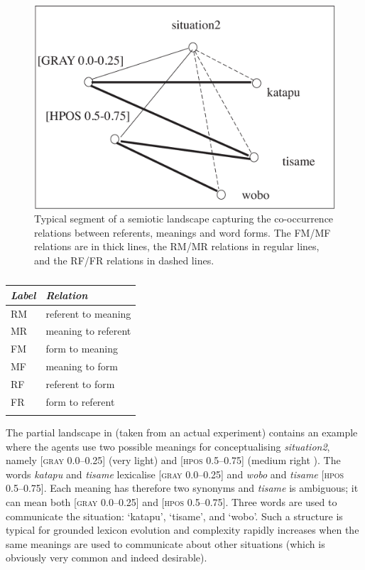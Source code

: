 \begin{figure}[t]
  \centerline{\includegraphics[width=.65\textwidth]{chap7/figs/landscape.pdf}}
\caption{\label{RMF1}Typical segment of a semiotic
landscape capturing the co-occurrence relations between
referents, meanings and word forms. The FM/MF relations are
in thick lines, the RM/MR relations in regular lines, and 
the RF/FR relations in dashed lines.}
\end{figure}
 
\begin{table}[b]
\begin{tabular}{ l  l  }
\lsptoprule
{\itshape Label}& {\itshape Relation } \\ \midrule
RM & referent to meaning \\ 
MR & meaning to referent \\ 
FM & form to meaning\\ 
MF & meaning to form\\ 
RF & referent to form \\ 
FR & form to referent  \\ 
\lspbottomrule
\end{tabular}
\caption{\label{tab:7labelrelation}}
\end{table}

The partial landscape in  (taken from
an actual experiment) contains an example where the agents use
two possible meanings for conceptualising {\itshape situation2}, namely
[\textsc{gray} 0.0–0.25] (very light) and [\textsc{hpos} 0.5–0.75]
(medium right ). The words \textit{katapu} and \textit{tisame} lexicalise
[\textsc{gray} 0.0–0.25] and \textit{wobo} and \textit{tisame} [\textsc{hpos} 0.5–0.75]. 
Each meaning has therefore two synonyms and \textit{tisame} is 
ambiguous; it can mean both [\textsc{gray} 0.0–0.25]
and [\textsc{hpos} 0.5–0.75].
\enlargethispage{1em}
Three words
are used to communicate the situation: `katapu', `tisame', 
and `wobo'. Such a structure is typical for grounded
lexicon evolution and complexity rapidly increases when the
same meanings are used to communicate about other
situations (which is obviously very common and indeed desirable). 

